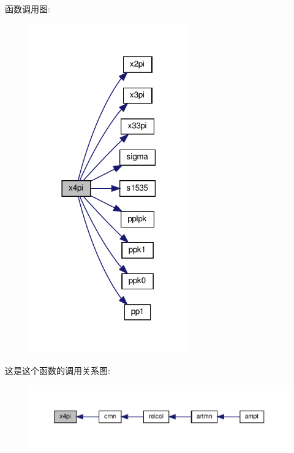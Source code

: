 函数调用图\+:
\nopagebreak
\begin{figure}[H]
\begin{center}
\leavevmode
\includegraphics[width=194pt]{x4pi_8f90_ac5cb0e5b402316190f4a7f3487df0e89_cgraph}
\end{center}
\end{figure}
这是这个函数的调用关系图\+:
\nopagebreak
\begin{figure}[H]
\begin{center}
\leavevmode
\includegraphics[width=350pt]{x4pi_8f90_ac5cb0e5b402316190f4a7f3487df0e89_icgraph}
\end{center}
\end{figure}
